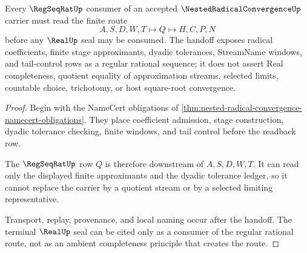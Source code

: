 \begin{theorem}
\label{thm:nested-radical-convergence-regseqrat-handoff}
Every $\RegSeqRatUp$ consumer of an accepted $\NestedRadicalConvergenceUp$ carrier must read the finite route
$$
A,S,D,W,T \longmapsto Q \longmapsto H,C,P,N
$$
before any $\RealUp$ seal may be consumed. The handoff exposes radical coefficients, finite stage approximants, dyadic tolerances, StreamName windows, and tail-control rows as a regular rational sequence; it does not assert Real completeness, quotient equality of approximation streams, selected limits, countable choice, trichotomy, or host square-root convergence.
\end{theorem}
\begin{proof}
Begin with the NameCert obligations of \autoref{thm:nested-radical-convergence-namecert-obligations}. They place coefficient admission, stage construction, dyadic tolerance checking, finite windows, and tail control before the readback row.

The $\RegSeqRatUp$ row $Q$ is therefore downstream of $A,S,D,W,T$. It can read only the displayed finite approximants and the dyadic tolerance ledger, so it cannot replace the carrier by a quotient stream or by a selected limiting representative.

Transport, replay, provenance, and local naming occur after the handoff. The terminal $\RealUp$ seal can be cited only as a consumer of the regular rational route, not as an ambient completeness principle that creates the route.
\end{proof}


\begin{closurestatus}{\NestedRadicalConvergenceUp}
  \theoryclosure{\seedClosure}
  \formalstatus{\unformalizedV}
\end{closurestatus}

